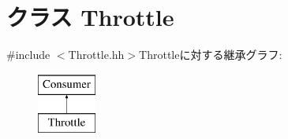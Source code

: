 \hypertarget{classThrottle}{
\section{クラス Throttle}
\label{classThrottle}
}


{\ttfamily \#include $<$Throttle.hh$>$}Throttleに対する継承グラフ:\begin{figure}[H]
\begin{center}
\leavevmode
\includegraphics[height=2cm]{classThrottle}
\end{center}
\end{figure}
